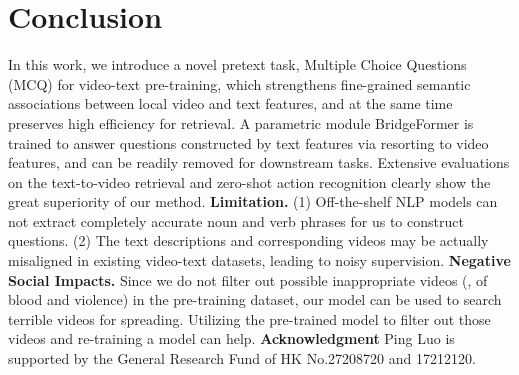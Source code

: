 \documentclass[10pt,twocolumn,letterpaper]{article}
\begin{document}
\section{Conclusion}
In this work, we introduce a novel pretext task, Multiple Choice Questions (MCQ) for video-text pre-training, which strengthens fine-grained semantic associations between local video and text features, and at the same time preserves high efficiency for retrieval. A parametric module BridgeFormer is trained to answer questions constructed by text features via resorting to video features, and can be readily removed for downstream tasks. Extensive evaluations on the text-to-video retrieval and zero-shot action recognition clearly show the great superiority of our method. 
{\flushleft \bf Limitation.} (1) Off-the-shelf NLP models can not  extract completely accurate noun and verb phrases for us to construct questions. (2) The text descriptions and corresponding videos may be actually misaligned in existing video-text datasets, leading to noisy supervision.
{\flushleft \bf Negative Social Impacts.} Since we do not filter out possible inappropriate videos (\eg, of blood and violence) in the pre-training dataset, our model can be used to search terrible videos for spreading. Utilizing the pre-trained model to filter out those videos and re-training a model can help.
{\flushleft \bf Acknowledgment} Ping Luo is supported by the General Research Fund of HK No.27208720 and 17212120.














	
\end{document}
